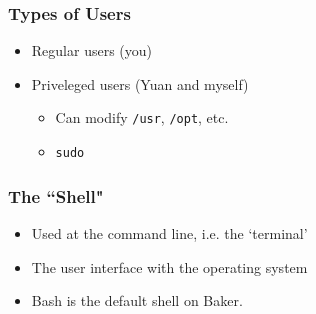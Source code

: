 \documentclass{beamer}
\newcommand{\code}[1]{\colorbox{codegray}{\texttt{#1}}}
\begin{document}
 

\begin{frame}
\frametitle{Types of Users}
\begin{itemize}
    \item Regular users (you)
    \bigskip

    \item Priveleged users (Yuan and myself)
    \bigskip

    \begin{itemize}
        \item Can modify \code{/usr}, \code{/opt}, etc.
        \bigskip

        \item \code{sudo}
    \end{itemize}
\end{itemize}
\end{frame}


\begin{frame}
\frametitle{The ``Shell"}
    \begin{itemize}
        \item Used at the command line, i.e. the `terminal'
        \bigskip
        \item The user interface with the operating system
        \bigskip
        \item Bash is the default shell on Baker.
    \end{itemize}
\end{frame}
\end{document}
